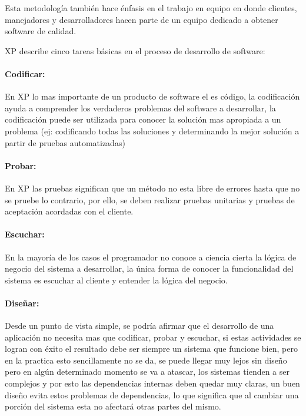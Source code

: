 Esta metodología también hace énfasis en el trabajo en equipo en donde clientes, manejadores y desarrolladores hacen parte de un equipo dedicado a obtener software de calidad.

XP describe cinco tareas básicas en el proceso de desarrollo de software:

\paragraph{Codificar:} En XP lo mas importante de un producto de software el es código, la codificación ayuda a comprender los verdaderos problemas del software a desarrollar, la codificación puede ser utilizada para conocer la solución mas apropiada a un problema (ej: codificando todas las soluciones y determinando la mejor solución a partir de pruebas automatizadas)

\paragraph{Probar:} En XP las pruebas significan que un método no esta libre de errores hasta que no se pruebe lo contrario, por ello, se deben realizar pruebas unitarias y pruebas de aceptación acordadas con el cliente.

\paragraph{Escuchar:} En la mayoría de los casos el programador no conoce a ciencia cierta la lógica de negocio del sistema a desarrollar, la única forma de conocer la funcionalidad del sistema es escuchar al cliente y entender la lógica del negocio.

\paragraph{Diseñar:} Desde un punto de vista simple, se podría afirmar que el desarrollo de una aplicación no necesita mas que codificar, probar y escuchar, si estas actividades se logran con éxito el resultado debe ser siempre un sistema que funcione bien, pero en la practica esto sencillamente no se da, se puede llegar muy lejos sin diseño pero en algún determinado momento se va a atascar, los sistemas tienden a ser complejos y por esto las dependencias internas deben quedar muy claras, un buen diseño evita estos problemas de dependencias, lo que significa que al cambiar una porción del sistema esta no afectará otras partes del mismo.

